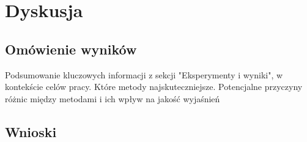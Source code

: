 
\chapter*{Dyskusja}

\section*{Omówienie wyników}
Podsumowanie kluczowych informacji z sekcji "Eksperymenty i wyniki", w kontekście celów pracy.
Które metody najskuteczniejsze.
Potencjalne przyczyny różnic między metodami i ich wpływ na jakość wyjaśnień

\section*{Wnioski}

